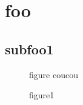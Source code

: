 \documentclass{article}
\begin{document}

\listoffigures

\section{foo}

\subsection{subfoo1}

\begin{figure}[htbp]
  \centering
  figure coucou
  \caption{figure1}
\end{figure}
\end{document}
